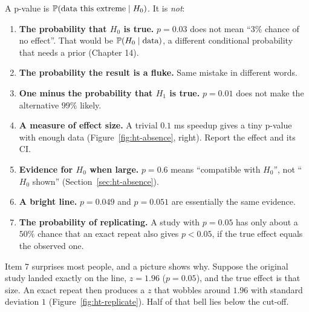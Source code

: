 \begin{trapbox}
A p-value is $\P(\text{data this extreme} \mid H_0)$. It is \emph{not}:
\begin{enumerate}
\item \textbf{The probability that $H_0$ is true.} $p=0.03$ does not mean ``$3\%$
chance of no effect''. That would be $\P(H_0\mid\text{data})$, a different conditional
probability that needs a prior (Chapter 14).
\item \textbf{The probability the result is a fluke.} Same mistake in different words.
\item \textbf{One minus the probability that $H_1$ is true.} $p=0.01$ does not make
the alternative $99\%$ likely.
\item \textbf{A measure of effect size.} A trivial $0.1$ ms speedup gives a tiny p-value
with enough data (Figure~\ref{fig:ht-absence}, right). Report the effect and its CI.
\item \textbf{Evidence for $H_0$ when large.} $p=0.6$ means ``compatible with $H_0$'',
not ``$H_0$ shown'' (Section~\ref{sec:ht-absence}).
\item \textbf{A bright line.} $p=0.049$ and $p=0.051$ are essentially the same
evidence.
\item \textbf{The probability of replicating.} A study with $p=0.05$ has only about a
$50\%$ chance that an exact repeat also gives $p<0.05$, if the true effect equals the
observed one.
\end{enumerate}
\end{trapbox}

Item 7 surprises most people, and a picture shows why. Suppose the original study
landed exactly on the line, $z=1.96$ ($p=0.05$), and the true effect is that
size. An exact repeat then produces a $z$ that wobbles around $1.96$ with standard
deviation $1$ (Figure~\ref{fig:ht-replicate}). Half of that bell lies below the cut-off.

